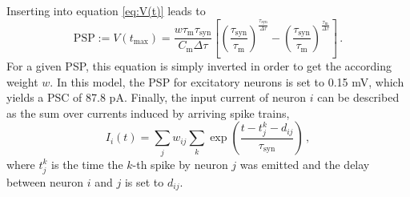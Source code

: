 Inserting into equation \eqref{eq:V(t)} leads to 
\begin{equation}
    \text{PSP} := V(t_\text{max}) 
        = \frac{w \tau_\text{m} \tau_\text{syn}}{C_\text{m} \Delta\tau}	
            \left[ 
                \left( \frac{\tau_\text{syn}}{\tau_\text{m}} \right)^\frac{\tau_\text{syn}}{\Delta\tau} 
            - \left( \frac{\tau_\text{syn}}{\tau_\text{m}} \right)^\frac{\tau_\text{m}}{\Delta\tau} 
            \right] \,.
    \label{eq:PSP}
\end{equation}
For a given PSP, this equation is simply inverted in order to get the according 
weight $w$. In this model, the PSP for excitatory neurons is set to 0.15 mV, 
which yields a PSC of 87.8 pA. 
Finally, the 
input current of neuron $i$ can be described as the sum over currents induced by
arriving spike trains, 
\begin{equation}
    I_i(t) = \sum_j w_{ij} \sum_k \exp\left(\frac{t - t_j^k - d_{ij}}{\tau_\text{syn}}\right) \, ,
    \label{eq:input_current}
\end{equation}
where $t_j^k$ is the time the $k$-th spike by neuron $j$ was emitted and the 
delay between neuron $i$ and $j$ is set to $d_{ij}$. 

